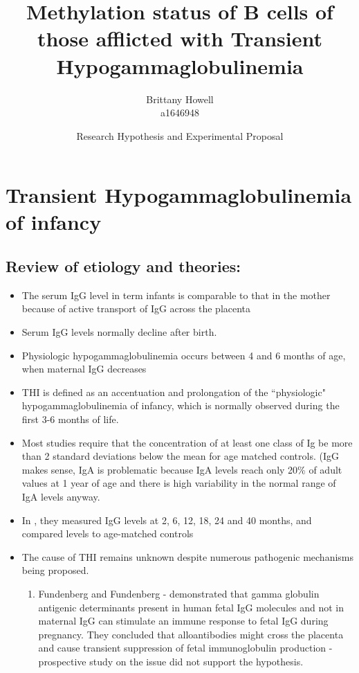\documentclass[12pt]{article}
\title{Methylation status of B cells of those afflicted with Transient Hypogammaglobulinemia}
\date{Research Hypothesis and Experimental Proposal}
\author{Brittany Howell \\ a1646948}
\begin{document}
	\maketitle
	\tableofcontents
	
	\section{Transient Hypogammaglobulinemia of infancy}
		
		\subsection{Review of etiology and theories: \citeauthor{Ovadia14} \citeyear{Ovadia14}}
		
			\begin{itemize}
				\item The serum IgG level in term infants is comparable to that in the mother because of active transport of IgG across the placenta \citep{Dalal98}
				\item Serum IgG levels normally decline after birth. 
				\item Physiologic hypogammaglobulinemia occurs between 4 and 6 months of age, when maternal IgG decreases \citep{Dressler89}
				\item THI is defined as an accentuation and prolongation of the ``physiologic" hypogammaglobulinemia of infancy, which is normally observed during the first 3-6 months of life. 
				\item Most studies require that the concentration of at least one class of Ig be more than 2 standard deviations below the mean for age matched controls. (IgG makes sense, IgA is problematic because IgA levels reach only 20\% of adult values at 1 year of age and there is high variability in the normal range of IgA levels anyway.
				\item In \citet{Dressler89}, they measured IgG levels at 2, 6, 12, 18, 24 and 40 months, and compared levels to age-matched controls
				\item The cause of THI remains unknown despite numerous pathogenic mechanisms being proposed.
				\begin{enumerate}
					\item Fundenberg and Fundenberg - demonstrated that gamma globulin antigenic determinants present in human fetal IgG molecules and not in maternal IgG can stimulate an immune response to fetal IgG during pregnancy. They concluded that alloantibodies might cross the placenta and cause transient suppression of fetal immunoglobulin production - prospective study on the issue did not support the hypothesis. 

\end{enumerate}
\end{itemize}
\end{document}
